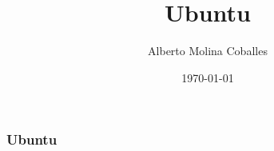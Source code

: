 \documentclass{beamer}
\author{Alberto Molina Coballes}
\title{Ubuntu}
\institute{IES Gonzalo Nazareno}
\date{\today}
\begin{document}
\begin{frame}[t,plain]
\titlepage
\end{frame}

\begin{frame} \frametitle{Ubuntu}
\end{frame}
\end{document}
